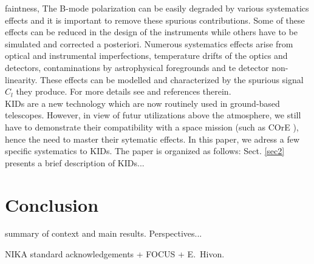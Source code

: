\documentclass[twocolumn, traditabstract]{aa}
\begin{document}
faintness, The B-mode polarization can be easily degraded by various systematics
effects and it is important to remove these spurious contributions. Some of
these effects can be reduced in the design of the instruments while others have
to be simulated and corrected a posteriori. Numerous systematics effects arise
from optical and instrumental imperfections, temperature drifts of the optics
and detectors, contaminations by astrophysical foregrounds and te detector
non-linearity. These effects can be modelled and characterized by the spurious
signal $C_{l}$ they produce. For more details see \citep{2008PhRvD..77h3003S,
  quickpol} and references therein.\\ KIDs are a new technology which are now
routinely used in ground-based telescopes. However, in view of futur
utilizations above the atmosphere, we still have to demonstrate their
compatibility with a space mission (such as COrE \citep{2016arXiv160907263D}),
hence the need to master their sytematic effects. In this paper, we adress a few
specific systematics to KIDs. The paper is organized as follows:
Sect. \ref{sec2} presents a brief description of KIDs...










\section{Conclusion}
\label{conclusion}

summary of context and main results. Perspectives...
 


\begin{acknowledgements}
NIKA standard acknowledgements + FOCUS + E.~Hivon.
\end{acknowledgements}
\end{document}
